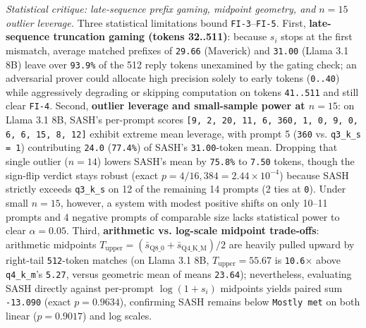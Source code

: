 \documentclass[11pt,letterpaper]{article}
\begin{document}
\textit{Statistical critique: late-sequence prefix gaming, midpoint geometry, and $n = 15$ outlier leverage.} Three statistical limitations bound \texttt{FI-3}--\texttt{FI-5}. First, \textbf{late-sequence truncation gaming (tokens 32..511)}: because $s_i$ stops at the first mismatch, average matched prefixes of \texttt{29.66} (Maverick) and \texttt{31.00} (Llama 3.1 8B) leave over \texttt{93.9\%} of the 512 reply tokens unexamined by the gating check; an adversarial prover could allocate high precision solely to early tokens (\texttt{0..40}) while aggressively degrading or skipping computation on tokens \texttt{41..511} and still clear \texttt{FI-4}. Second, \textbf{outlier leverage and small-sample power at $n = 15$}: on Llama 3.1 8B, SASH's per-prompt scores \texttt{[9, 2, 20, 11, 6, 360, 1, 0, 9, 0, 6, 6, 15, 8, 12]} exhibit extreme mean leverage, with prompt 5 (\texttt{360} vs. \texttt{q3\_\allowbreak{}k\_\allowbreak{}s = 1}) contributing \texttt{24.0} (\texttt{77.4\%}) of SASH's \texttt{31.00}-token mean. Dropping that single outlier ($n = 14$) lowers SASH's mean by \texttt{75.8\%} to \texttt{7.50} tokens, though the sign-flip verdict stays robust (exact $p = 4/16{,}384 = 2.44 \times 10^{-4}$) because SASH strictly exceeds \texttt{q3\_\allowbreak{}k\_\allowbreak{}s} on 12 of the remaining 14 prompts (2 ties at \texttt{0}). Under small $n = 15$, however, a system with modest positive shifts on only 10--11 prompts and 4 negative prompts of comparable size lacks statistical power to clear $\alpha = 0.05$. Third, \textbf{arithmetic vs. log-scale midpoint trade-offs}: arithmetic midpoints $T_{\text{upper}} = (\bar{s}_{\text{Q8\_0}} + \bar{s}_{\text{Q4\_K\_M}})/2$ are heavily pulled upward by right-tail \texttt{512}-token matches (on Llama 3.1 8B, $T_{\text{upper}} = 55.67$ is \texttt{10.6$\times$} above \texttt{q4\_\allowbreak{}k\_\allowbreak{}m}'s \texttt{5.27}, versus geometric mean of means \texttt{23.64}); nevertheless, evaluating SASH directly against per-prompt $\log(1+s_i)$ midpoints yields paired sum \texttt{-13.090} (exact $p = 0.9634$), confirming SASH remains below \texttt{Mostly met} on both linear ($p = 0.9017$) and log scales.
\end{document}
